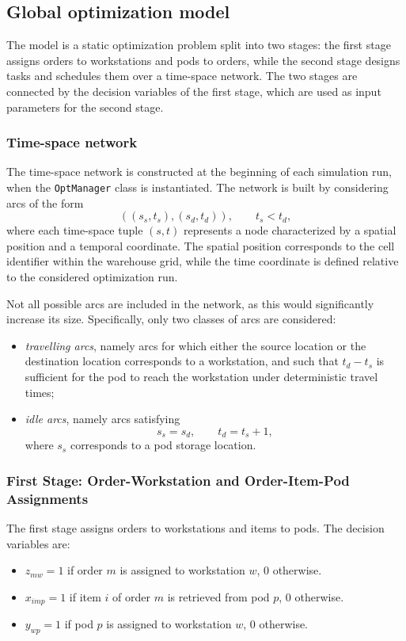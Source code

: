 \documentclass[a4paper,10pt]{article}
\begin{document}
\subsection{Global optimization model}

The model is a static optimization problem split into two stages: the first stage assigns orders to workstations and pods to orders, while the second stage designs tasks and schedules them over a time-space network. The two stages are connected by the decision variables of the first stage, which are used as input parameters for the second stage.

\subsubsection{Time-space network}
The time-space network is constructed at the beginning of each simulation run, when the \texttt{OptManager} class is instantiated. The network is built by considering arcs of the form
\[
\left((s_s, t_s), (s_d, t_d)\right), \qquad t_s < t_d,
\]
where each time-space tuple $(s,t)$ represents a node characterized by a spatial position and a temporal coordinate. The spatial position corresponds to the cell identifier within the warehouse grid, while the time coordinate is defined relative to the considered optimization run.

Not all possible arcs are included in the network, as this would significantly increase its size. Specifically, only two classes of arcs are considered:
\begin{itemize}
    \item \emph{travelling arcs}, namely arcs for which either the source location or the destination location corresponds to a workstation, and such that $t_d - t_s$ is sufficient for the pod to reach the workstation under deterministic travel times; 
    \item \emph{idle arcs}, namely arcs satisfying
    \[
    s_s = s_d, \qquad t_d = t_s + 1,
    \]
    where $s_s$ corresponds to a pod storage location.
\end{itemize}

\subsubsection{First Stage: Order-Workstation and Order-Item-Pod Assignments}

The first stage assigns orders to workstations and items to pods. The decision
variables are:
\begin{itemize}[noitemsep]
    \item $z_{mw} = 1$ if order $m$ is assigned to workstation $w$, $0$ otherwise.
    \item $x_{imp} = 1$ if item $i$ of order $m$ is retrieved from pod $p$, $0$ otherwise.
    \item $y_{wp} = 1$ if pod $p$ is assigned to workstation $w$, $0$ otherwise.
\end{itemize}
\end{document}
